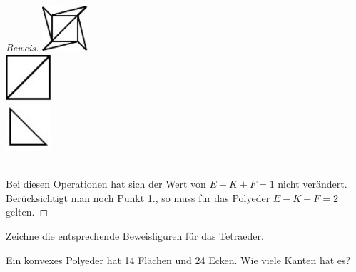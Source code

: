 \documentclass[%
11pt,%
twoside,%
titlepage,%
german,%
headsepline%
]{scrartcl}
\begin{document}
\begin{proof}[Beweis]
\begin{minipage}{1.7cm}
\includegraphics[width=1.7cm]{pictures/wuerf4}\\[6ex]
\includegraphics[width=1.7cm]{pictures/wuerf5}\\[7ex]
\includegraphics[width=1.7cm]{pictures/wuerf6}
\end{minipage}\\
Bei diesen Operationen hat sich der Wert von $E-K+F=1$ nicht ver\"andert. Ber\"ucksichtigt man noch Punkt 1., so muss f\"ur das Polyeder $E-K+F=2$ gelten.
\end{proof}

\begin{ueb}
Zeichne die entsprechende Beweisfiguren f\"ur das Tetraeder.
\end{ueb}

\begin{ueb}
Ein konvexes Polyeder hat 14 Fl\"achen und 24 Ecken. Wie viele Kanten hat es?
\end{ueb}

\clearpage
\end{document}
